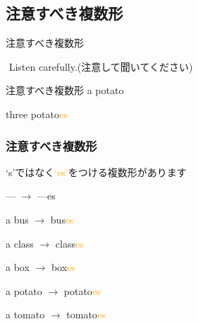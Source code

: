 \documentclass[aspectratio=169,xcolor={dvipsnames,table}]{beamer}
\newcommand{\myaudio}[1]{\href{#1}{\faVolumeUp}}
\begin{document}
\subsection{注意すべき複数形}
\begin{frame}[plain]{注意すべき複数形}

\hspace{15pt}
\pause

\bigskip

\bigskip

\hspace{15pt}

\myaudio{./audio/005_singular_plural_05.mp3}\,\,{}Listen carefully.(注意して聞いてください)
\end{frame}
\begin{frame}[plain]{注意すべき複数形}
\hspace{15pt}
\pause
{\LARGE a potato}
\pause

\bigskip

\bigskip

\hspace{15pt}
\pause
{\LARGE three  potato\textcolor{orange}{es}}

\myaudio{./audio/005_singular_plural_06.mp3}
\end{frame}
\begin{frame}[plain]\frametitle{注意すべき複数形}

{\Large `s'ではなく\textcolor{orange}{`es'}をつける複数形があります}
\pause

\bigskip

\begin{block}{--- $\rightarrow$ ---es}

a bus \pause$\longrightarrow$ bus\textcolor{orange}{es}\pause%
\hfill{}\hspace*{250pt}\pause

a class \pause$\longrightarrow$ class\textcolor{orange}{es}\pause
\hfill{}\hspace*{250pt}\pause

a box \pause $\longrightarrow$ box\textcolor{orange}{es}\pause
\hfill{}\hspace*{250pt}\pause

a potato \pause$\longrightarrow$ potato\textcolor{orange}{es}\pause
\hfill{}\hspace*{250pt}\pause

a tomato \pause$\longrightarrow$ tomato\textcolor{orange}{es}\pause
\hfill{}\hspace*{250pt}


\end{block}
\end{frame}
\end{document}
